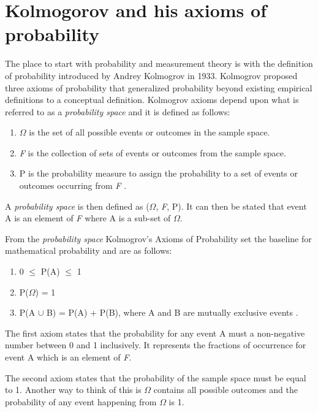 \documentclass{article}
\author{peparhugo }
\date{November 2020}
\begin{document}
\maketitle

\section{Kolmogorov and his axioms of probability}
The place to start with probability and measurement theory is with the definition of probability introduced by Andrey Kolmogrov in 1933. Kolmogrov proposed three axioms of probability that generalized probability beyond existing empirical definitions to a conceptual definition. Kolmogrov axioms depend upon what is referred to as a \textit{probability space} and it is defined as follows:

\begin{enumerate}
  \item $\Omega$ is the set of all possible events or outcomes in the sample space.
  \item \textit{F} is the collection of sets of events or outcomes from the sample space.
  \item P is the probability measure to assign the probability to a set of events or outcomes occurring from \textit{F} \cite{meyers}.
\end{enumerate}

A \textit{probability space} is then defined as ($\Omega$, \textit{F}, P). It can then be stated that event A is an element of \textit{F} where A is a sub-set of $\Omega$.

From the \textit{probability space} Kolmogrov's Axioms of Probability set the baseline for mathematical probability and are as follows:

\begin{enumerate}
  \item 0 $\leq$ P(A) $\leq$ 1
  \item P($\Omega$) = 1
  \item P(A $\cup$ B) = P(A) + P(B), where A and B are mutually exclusive events \cite{meyers}.
\end{enumerate}

The first axiom states that the probability for any event A must a non-negative number between 0 and 1 inclusively. It represents the fractions of occurrence for event A which is an element of \textit{F}.

The second axiom states that the probability of the sample space must be equal to 1. Another way to think of this is $\Omega$ contains all possible outcomes and the probability of any event happening from $\Omega$ is 1.
\end{document}
